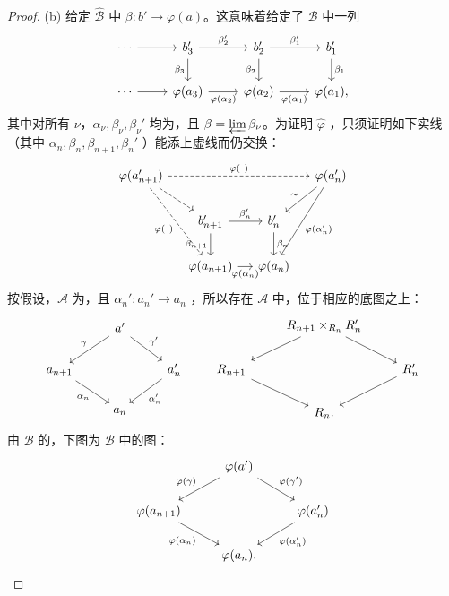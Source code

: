 \begin{proof}
(b) 给定 $\widehat{\mathcal B}$ 中 $\beta:b'\to\varphi(a)$。这意味着给定了 $\mathcal B$ 中一列
\[
\begin{tikzcd}
\cdots\arrow[r]&b_3'\arrow[r,"\beta_2'"]\arrow[d,"\beta_3"']&b_2'\arrow[r,"\beta_1'"]\arrow[d,"\beta_2"']&b_1'\arrow[d,"\beta_1"]\\
\cdots\arrow[r]&\varphi(a_3)\arrow[r,"\varphi(\alpha_2)"']&\varphi(a_2)\arrow[r,"\varphi(\alpha_1)"']&\varphi(a_1),
\end{tikzcd}
\]
其中对所有 $\nu$，$\alpha_\nu,\beta_\nu,\beta_\nu'$ 均为，且 $\beta=\varprojlim\beta_\nu$。为证明 $\widehat\varphi$ ，只须证明如下实线（其中 $\alpha_n,\beta_n,\beta_{n+1},\beta_n'$ ）能添上虚线而仍交换：
\[
\begin{tikzcd}[column sep=small]
\varphi(a_{n+1}')\arrow[rrr,dashed,"\varphi(\ )"]\arrow[dr,dashed]\arrow[ddr,dashed,"\varphi(\ )"']&&&\varphi(a_n')\arrow[dl,"\sim"']\arrow[ddl,"\varphi(\alpha_n')"]\\
&b_{n+1}'\arrow[r,"\beta_n'"]\arrow[d,"\beta_{n+1}"']&b_n'\arrow[d,"\beta_n"]&\\
&\varphi(a_{n+1})\arrow[r,"\varphi(\alpha_n)"']&\varphi(a_n)&
\end{tikzcd}
\]
按假设，$\mathcal A$ 为，且 $\alpha_n':a_n'\to a_n$ ，所以存在 $\mathcal A$ 中，位于相应的底图之上：
\[
\begin{tikzcd}&a'\arrow[dl,"\gamma"']\arrow[dr,"\gamma'"]\\a_{n+1}\arrow[dr,"\alpha_n"']&&a_n'\arrow[dl,"\alpha_n'"]\\&a_n\end{tikzcd}
\qquad
\begin{tikzcd}&R_{n+1}\times_{R_n}R_n'\arrow[dl]\arrow[dr]\\R_{n+1}\arrow[dr]&&R_n'\arrow[dl]\\&R_n.\end{tikzcd}
\]
由 $\mathcal B$ 的，下图为 $\mathcal B$ 中的图：
\[
\begin{tikzcd}&\varphi(a')\arrow[dl,"\varphi(\gamma)"']\arrow[dr,"\varphi(\gamma')"]\\\varphi(a_{n+1})\arrow[dr,"\varphi(\alpha_n)"']&&\varphi(a_n')\arrow[dl,"\varphi(\alpha_n')"]\\&\varphi(a_n).\end{tikzcd}
\]
\end{proof}
